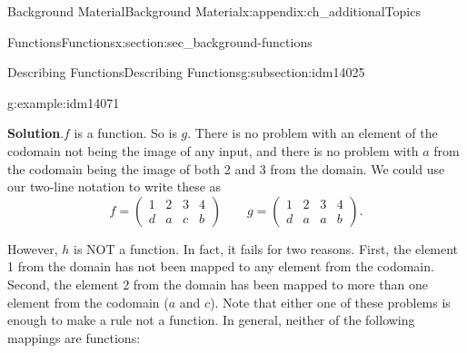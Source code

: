 \documentclass[oneside,10pt,]{book}
\numberwithin{equation}{chapter}
\newcommand{\amp}{&}
\begin{document}
\begin{appendixptx}{Background Material}{}{Background Material}{}{}{x:appendix:ch_additionalTopics}
\begin{sectionptx}{Functions}{}{Functions}{}{}{x:section:sec_background-functions}
\begin{subsectionptx}{Describing Functions}{}{Describing Functions}{}{}{g:subsection:idm14025}
\begin{example}{}{g:example:idm14071}
\begin{sidebyside}{3}{0.0416666666666667}{0.0416666666666667}{0.0833333333333333}
\begin{sbspanel}{0.25}
%
\end{sbspanel}%
\begin{sbspanel}{0.25}%
%
\end{sbspanel}%
\end{sidebyside}%
\par\smallskip%
\noindent\textbf{Solution}.\hypertarget{g:solution:idm14083}{}\quad{}\(f\) is a function. So is \(g\). There is no problem with an element of the codomain not being the image of any input, and there is no problem with \(a\) from the codomain being the image of both 2 and 3 from the domain. We could use our two-line notation to write these as%
\begin{equation*}
f= \begin{pmatrix} 1 \amp 2 \amp 3 \amp 4 \\ d \amp a \amp c \amp b \end{pmatrix} \qquad g = \begin{pmatrix} 1 \amp 2 \amp 3 \amp 4 \\ d \amp a \amp a \amp b \end{pmatrix}.
\end{equation*}
%
\par
However, \(h\) is NOT a function. In fact, it fails for two reasons. First, the element 1 from the domain has not been mapped to any element from the codomain. Second, the element 2 from the domain has been mapped to more than one element from the codomain (\(a\) and \(c\)). Note that either one of these problems is enough to make a rule not a function. In general, neither of the following mappings are functions:%

\end{example}
\end{subsectionptx}
\end{sectionptx}
\end{appendixptx}
\end{document}
